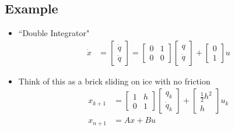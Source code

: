\documentclass[11pt]{article}
\begin{document}
\subsection{Example}
\begin{itemize}
    \item ``Double Integrator"
    \begin{align*}
        \dot{x} &=
        \begin{bmatrix}
            \dot{q} \\
            \ddot{q}
        \end{bmatrix}
        =
        \begin{bmatrix}
            0 & 1 \\
            0 & 0
        \end{bmatrix}
        \begin{bmatrix}
            q \\
            \dot{q}
        \end{bmatrix}
        + 
        \begin{bmatrix}
            0 \\
            1
        \end{bmatrix}
        u
    \end{align*}
    \item Think of this as a brick sliding on ice with no friction
    \begin{align*}
        x_{k+1} &= \begin{bmatrix}
            1 & h \\
            0 & 1
        \end{bmatrix}
        \begin{bmatrix}
            q_k \\
            \dot{q}_k
        \end{bmatrix}
        + 
        \begin{bmatrix}
            \frac{1}{2}h^2 \\
            h
        \end{bmatrix}
        u_k
        \\
        x_{n+1} &= Ax + Bu
    \end{align*}
\end{itemize}
\end{document}
